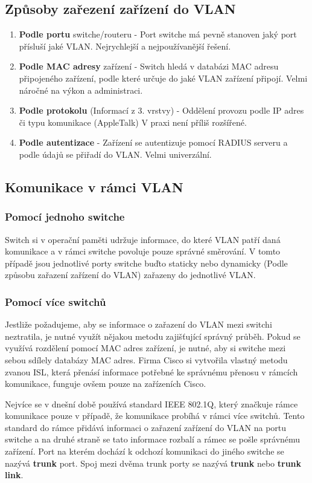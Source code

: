 \subsection{Způsoby zařezení zařízení do VLAN}
\begin{enumerate}
    \item \textbf{Podle portu} switche/routeru - Port switche má pevně stanoven jaký port přísluší jaké VLAN.
    Nejrychlejší a nejpoužívanější řešení.
    \item \textbf{Podle MAC adresy} zařízení - Switch hledá v databázi MAC adresu připojeného zařízení, podle které určuje do jaké VLAN zařízení připojí.
    Velmi náročné na výkon a administraci.
    \item \textbf{Podle protokolu} (Informací z 3. vrstvy) - Oddělení provozu podle IP adres či typu komunikace (AppleTalk)
    V praxi není příliš rozšířené.
    \item \textbf{Podle autentizace} - Zařízení se autentizuje pomocí RADIUS serveru a podle údajů se přiřadí do VLAN.
    Velmi univerzální.
\end{enumerate}
\subsection{Komunikace v rámci VLAN}
\subsubsection{Pomocí jednoho switche}
Switch si v operační paměti udržuje informace, do které VLAN patří daná komunikace a v rámci switche povoluje pouze správné směrování.
V tomto případě jsou jednotlivé porty switche buďto staticky nebo dynamicky (Podle způsobu zařazení zařízení do VLAN) zařazeny do jednotlivé VLAN.
\subsubsection{Pomocí více switchů}
Jestliže požadujeme, aby se informace o zařazení do VLAN mezi switchi neztratila, je nutné využít nějakou metodu zajišťující správný průběh.
Pokud se využívá rozdělení pomocí MAC adres zařízení, je nutné, aby si switche mezi sebou sdílely databázy MAC adres.
Firma Cisco si vytvořila vlastný metodu zvanou ISL, která přenásí informace potřebné ke správnému přenosu v rámcích komunikace, funguje ovšem pouze na zařízeních Cisco.

Nejvíce se v dnešní době používá standard IEEE 802.1Q, který značkuje rámce komunikace pouze v případě, že komunikace probíhá v rámci více switchů.
Tento standard do rámce přidává informaci o zařazení zařízení do VLAN na portu switche a na druhé straně se tato informace rozbalí a rámec se pošle správnému zařízení.
Port na kterém dochází k odchozí komunikaci do jiného switche se nazývá \textbf{trunk} port.
Spoj mezi dvěma trunk porty se nazývá \textbf{trunk} nebo \textbf{trunk link}.
